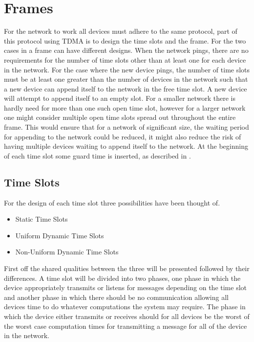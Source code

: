 \section{Frames}
For the network to work all devices must adhere to the same protocol, part of this protocol using TDMA is to design the time slots and the frame.
For the two cases in  a frame can have different designs.
When the network pings, there are no requirements for the number of time slots other than at least one for each device in the network.
For the case where the new device pings, the number of time slots must be at least one greater than the number of devices in the network such that a new device can append itself to the network in the free time slot.
A new device will attempt to append itself to an empty slot.
For a smaller network there is hardly need for more than one such open time slot, however for a larger network one might consider multiple open time slots spread out throughout the entire frame.
This would ensure that for a network of significant size, the waiting period for appending to the network could be reduced, it might also reduce the risk of having multiple devices waiting to append itself to the network.
At the beginning of each time slot some guard time is inserted, as described in .

\subsection{Time Slots}
For the design of each time slot three possibilities have been thought of.
\begin{itemize}
    \item Static Time Slots
    \item Uniform Dynamic Time Slots
    \item Non-Uniform Dynamic Time Slots
\end{itemize}
First off the shared qualities between the three will be presented followed by their differences.
A time slot will be divided into two phases, one phase in which the device appropriately transmits or listens for messages depending on the time slot and another phase in which there should be no communication allowing all devices time to do whatever computations the system may require.
The phase in which the device either transmits or receives should for all devices be the worst of the worst case computation times for transmitting a message for all of the device in the network.


